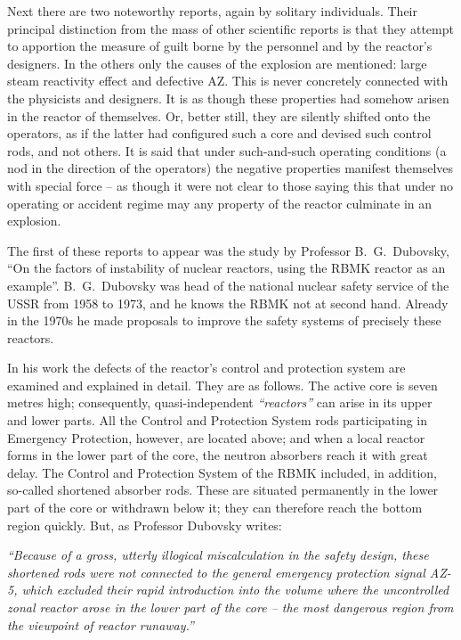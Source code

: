 \documentclass[openright]{bookest}
\begin{document}
Next there are two noteworthy reports, again by solitary individuals. Their principal distinction from the mass of other scientific reports is that they attempt to apportion the measure of guilt borne by the personnel and by the reactor's designers. In the others only the causes of the explosion are mentioned: large steam reactivity effect and defective AZ. This is never concretely connected with the physicists and designers. It is as though these properties had somehow arisen in the reactor of themselves. Or, better still, they are silently shifted onto the operators, as if the latter had configured such a core and devised such control rods, and not others. It is said that under such-and-such operating conditions (a nod in the direction of the operators) the negative properties manifest themselves with special force -- as though it were not clear to those saying this that under no operating or accident regime may any property of the reactor culminate in an explosion.


The first of these reports to appear was the study by Professor B.~G.~Dubovsky, ``On the factors of instability of nuclear reactors, using the RBMK reactor as an example''. B.~G.~Dubovsky was head of the national nuclear safety service of the USSR from 1958 to 1973, and he knows the RBMK not at second hand. Already in the 1970s he made proposals to improve the safety systems of precisely these reactors.

In his work the defects of the reactor's control and protection system are examined and explained in detail. They are as follows. The active core is seven metres high; consequently, quasi-independent \textit{``reactors''} can arise in its upper and lower parts. All the Control and Protection System rods participating in Emergency Protection, however, are located above; and when a local reactor forms in the lower part of the core, the neutron absorbers reach it with great delay. The Control and Protection System of the RBMK included, in addition, so-called shortened absorber rods. These are situated permanently in the lower part of the core or withdrawn below it; they can therefore reach the bottom region quickly. But, as Professor Dubovsky writes:

\begin{personal}
  \textit{``Because of a gross, utterly illogical miscalculation in the safety design, these shortened rods were not connected to the general emergency protection signal AZ-5, which excluded their rapid introduction into the volume where the uncontrolled zonal reactor arose in the lower part of the core -- the most dangerous region from the viewpoint of reactor runaway.''}
\end{personal}
\end{document}
